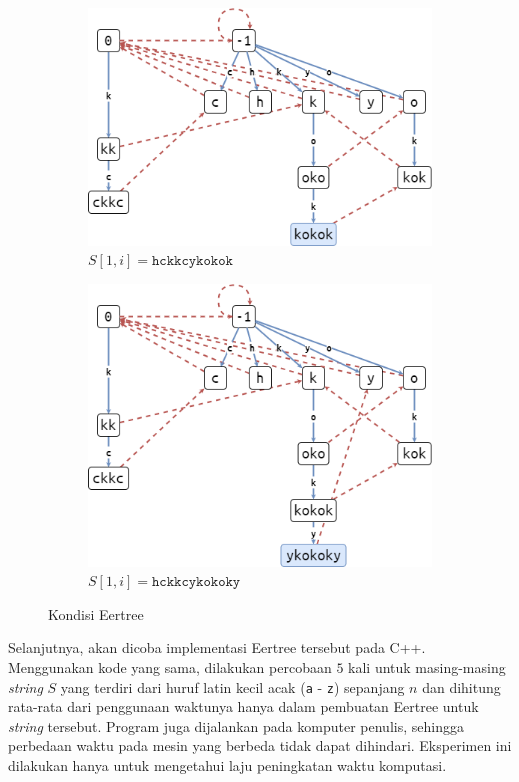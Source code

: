 \documentclass[11pt, a4paper, final]{article}
\begin{document}
\begin{figure}[H]
\label{eer9}
\centering
\begin{subfigure}[b]{0.45\textwidth}
\includegraphics[scale=0.4]{assets/eer09.png}
\caption{$S[1, i] = \texttt{hckkcykokok}$}
\end{subfigure}
\begin{subfigure}[b]{0.45\textwidth}
\includegraphics[scale=0.45]{assets/eer10.png}
\caption{$S[1, i] = \texttt{hckkcykokoky}$}
\end{subfigure}
\caption{Kondisi Eertree}
\end{figure}

Selanjutnya, akan dicoba implementasi Eertree tersebut pada C++. Menggunakan kode yang sama, dilakukan percobaan $5$ kali untuk masing-masing \textit{string} $S$ yang terdiri dari huruf latin kecil acak (\texttt{a} - \texttt{z}) sepanjang $n$ dan dihitung rata-rata dari penggunaan waktunya hanya dalam pembuatan Eertree untuk \textit{string} tersebut. Program juga dijalankan pada komputer penulis, sehingga perbedaan waktu pada mesin yang berbeda tidak dapat dihindari. Eksperimen ini dilakukan hanya untuk mengetahui laju peningkatan waktu komputasi.
\end{document}
